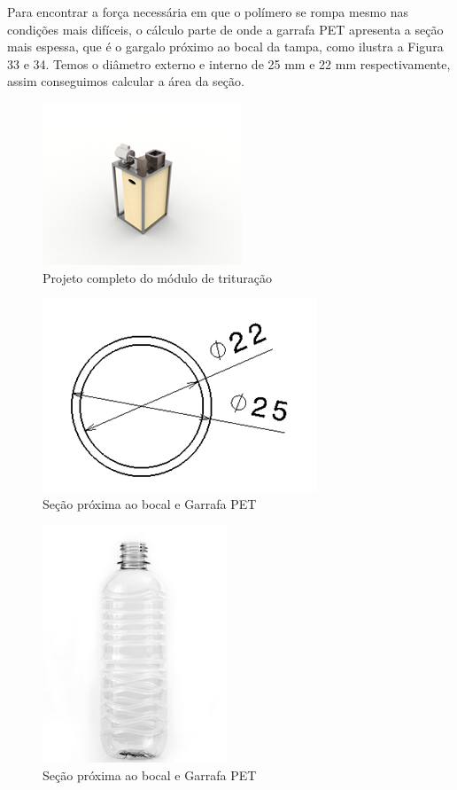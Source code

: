 Para encontrar a força necessária em que o polímero se rompa mesmo nas condições mais difíceis, o cálculo parte de onde a garrafa PET apresenta a seção mais espessa, que é o gargalo próximo ao bocal da tampa, como ilustra a Figura 33 e 34. Temos o diâmetro externo e interno de 25 mm e 22 mm respectivamente, assim conseguimos calcular a área da seção.

\begin{figure}[!h]
	\centering
		\includegraphics[scale=0.4]{figuras/estrutura/20(2).png}
	\caption{Projeto completo do módulo de trituração}
\end{figure}

\begin{figure}[!h]
	\centering
		\includegraphics[scale=0.4]{figuras/estrutura/21(1).png}
	\caption{Seção próxima ao bocal e Garrafa PET}
\end{figure}

\begin{figure}[!h]
	\centering
		\includegraphics[scale=0.4]{figuras/estrutura/21(2).png}
	\caption{Seção próxima ao bocal e Garrafa PET}
\end{figure}

